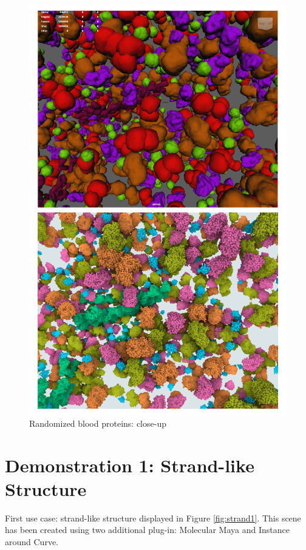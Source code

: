 \documentclass[
  digital, %
  table,   %
  nolof,     %
  nolot,     %
  oneside,
]{fithesis3}
\begin{document}
\begin{figure}
  \centering
  \includegraphics[scale=0.4]{images/demonstration/blood-closeup.png}
  \caption{Randomized blood proteins: close-up}
  \label{fig:blood-random-close}
\end{figure}

\section{Demonstration 1: Strand-like Structure}
First use case: strand-like structure displayed in Figure \ref{fig:strand1}. This scene has been created using two additional plug-in: Molecular Maya and Instance around Curve. 
\end{document}
